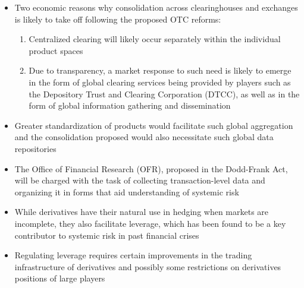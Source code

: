 \documentclass[11pt]{beamer}
\begin{document}
\begin{frame}
\begin{itemize}
\item Two economic reasons why consolidation across clearinghouses
and exchanges is likely to take off following the proposed OTC
reforms:
\begin{enumerate}
\item Centralized clearing will likely occur separately within the individual product spaces
\item Due to transparency, a market response to such need is likely to emerge in the form of global clearing services being provided by players such as the Depository Trust and Clearing Corporation (DTCC), as well as in the form of global information gathering and dissemination
\end{enumerate}
\end{itemize}
\end{frame}

\begin{frame}
\begin{itemize}
\item Greater standardization of products would facilitate such global aggregation and the consolidation proposed would also necessitate such global data repositories
\item The Office of Financial Research (OFR), proposed in the Dodd-Frank Act, will be charged with the task of collecting transaction-level data and organizing it in forms that aid understanding of systemic risk
\item While derivatives have their natural use in hedging when markets are incomplete, they also facilitate leverage, which has been found to be a key contributor to systemic risk in past financial crises
\item Regulating leverage requires certain improvements in the trading infrastructure of derivatives and possibly some restrictions on derivatives positions of large players
\end{itemize}
\end{frame}


\end{document}
